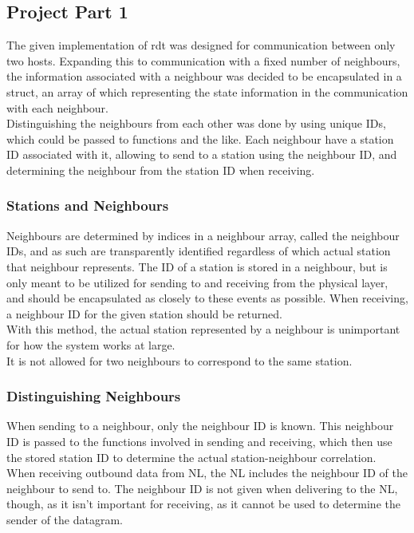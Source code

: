 \subsection{Project Part 1}
The given implementation of rdt was designed for communication between only two hosts. Expanding this to communication with a fixed number of neighbours, the information associated with a neighbour was decided to be encapsulated in a struct, an array of which representing the state information in the communication with each neighbour.\\
Distinguishing the neighbours from each other was done by using unique IDs, which could be passed to functions and the like. Each neighbour have a station ID associated with it, allowing to send to a station using the neighbour ID, and determining the neighbour from the station ID when receiving.

\subsubsection{Stations and Neighbours}
Neighbours are determined by indices in a neighbour array, called the neighbour IDs, and as such are transparently identified regardless of which actual station that neighbour represents. The ID of a station is stored in a neighbour, but is only meant to be utilized for sending to and receiving from the physical layer, and should be encapsulated as closely to these events as possible. When receiving, a neighbour ID for the given station should be returned.\\
With this method, the actual station represented by a neighbour is unimportant for how the system works at large.\\
It is not allowed for two neighbours to correspond to the same station.

%

\subsubsection{Distinguishing Neighbours}
When sending to a neighbour, only the neighbour ID is known. This neighbour ID is passed to the functions involved in sending and receiving, which then use the stored station ID to determine the actual station-neighbour correlation.\\
When receiving outbound data from NL, the NL includes the neighbour ID of the neighbour to send to. The neighbour ID is not given when delivering to the NL, though, as it isn't important for receiving, as it cannot be used to determine the sender of the datagram.

